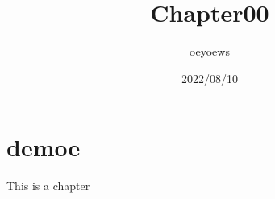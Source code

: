 \documentclass{article}
\title{Chapter00}
\author{oeyoews}
\date{2022/08/10}
\begin{document}
\maketitle

\chapter{demoe}
\label{cha:demoe}

This is a chapter
\end{document}
